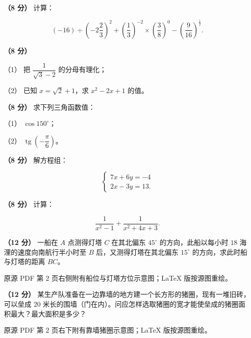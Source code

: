 \begin{question}
\textbf{（8 分）} 计算：

\nopagebreak[4]
\[
(-16)\div\left(-2\frac{2}{3}\right)^2+\left(\frac{1}{3}\right)^{-2}\times\left(\frac{3}{8}\right)^0-\left(\frac{9}{16}\right)^{\frac{1}{2}}.
\]

\end{question}
\begin{question}
\textbf{（8 分）} 

（1） 把 $\dfrac{1}{\sqrt{3}-2}$ 的分母有理化；

（2） 已知 $x=\sqrt{2}+1$，求 $x^2-2x+1$ 的值。

\end{question}
\begin{question}
\textbf{（8 分）} 求下列三角函数值：

（1） $\cos150^\circ$；

（2） $\operatorname{tg}\left(-\dfrac{\pi}{6}\right)$。

\end{question}
\begin{question}
\textbf{（8 分）} 解方程组：

\nopagebreak[4]
\[
\begin{cases}
7x+6y=-4\\
2x-3y=13.
\end{cases}
\]

\end{question}
\begin{question}
\textbf{（8 分）} 计算：

\nopagebreak[4]
\[
\frac{1}{x^2-1}+\frac{1}{x^2+4x+3}.
\]

\Needspace{0.4\textheight}
\end{question}
\begin{question}
\textbf{（12 分）} 一船在 $A$ 点测得灯塔 $C$ 在其北偏东 $45^\circ$ 的方向，此船以每小时 $18$ 海浬的速度向南航行半小时至 $B$ 后，又测得灯塔在其北偏东 $15^\circ$ 的方向，求此时船与灯塔的距离 $BC$。

\begin{gktip}
原源 PDF 第 2 页右侧附有船位与灯塔方位示意图；LaTeX 版按源图重绘。
\end{gktip}
\nopagebreak[4]
\begin{center}\end{center}
\nopagebreak[4]
\Needspace{0.4\textheight}
\end{question}
\begin{question}
\textbf{（12 分）} 某生产队准备在一边靠墙的地方建一个长方形的猪圈，现有一堆旧砖，可以垒成 $20$ 米长的围墙（门在内）。问应怎样选取猪圈的宽才能使垒成的猪圈面积最大？最大面积是多少？

\begin{gktip}
原源 PDF 第 2 页右下附有靠墙猪圈示意图；LaTeX 版按源图重绘。
\end{gktip}
\nopagebreak[4]
\begin{center}\end{center}
\nopagebreak[4]
\end{question}
